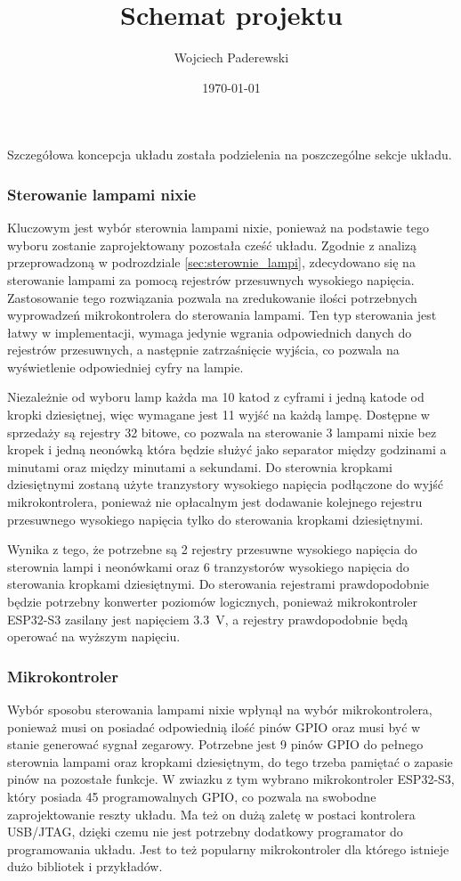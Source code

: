 \documentclass[../main.tex]{subfiles}
\author{Wojciech Paderewski}
\date{\today}
\title{Schemat projektu}
\begin{document}
Szczegółowa koncepcja układu została podzielenia na poszczególne sekcje układu.

\subsubsection{Sterowanie lampami nixie}
Kluczowym jest wybór sterownia lampami nixie, ponieważ na podstawie tego wyboru zostanie zaprojektowany pozostała cześć układu.
Zgodnie z analizą przeprowadzoną w podrozdziale \ref{sec:sterownie_lampi}, zdecydowano się na sterowanie lampami za pomocą rejestrów przesuwnych wysokiego napięcia.
Zastosowanie tego rozwiązania pozwala na zredukowanie ilości potrzebnych wyprowadzeń mikrokontrolera do sterowania lampami. Ten typ sterowania jest łatwy w implementacji,
wymaga jedynie wgrania odpowiednich danych do rejestrów przesuwnych, a następnie zatrzaśnięcie
 wyjścia, co pozwala na wyświetlenie odpowiedniej cyfry na lampie.

Niezależnie od wyboru lamp każda ma 10 katod z cyframi i jedną katode od kropki dziesiętnej, więc wymagane jest 11 wyjść na każdą lampę.
Dostępne w sprzedaży są rejestry 32 bitowe, co pozwala na sterowanie 3 lampami nixie bez kropek i jedną neonówką która będzie
służyć jako separator między godzinami a minutami oraz między minutami a sekundami. Do sterownia kropkami dziesiętnymi zostaną użyte tranzystory wysokiego napięcia podłączone do wyjść mikrokontrolera,
ponieważ nie opłacalnym jest dodawanie kolejnego rejestru przesuwnego wysokiego napięcia tylko do sterowania kropkami dziesiętnymi.

Wynika z tego, że potrzebne są 2 rejestry przesuwne wysokiego napięcia do sterownia lampi i neonówkami oraz 6 tranzystorów wysokiego napięcia do sterowania kropkami dziesiętnymi.
Do sterowania rejestrami prawdopodobnie będzie potrzebny konwerter poziomów logicznych, ponieważ mikrokontroler ESP32-S3 zasilany jest napięciem \SI{3.3}{\volt}, a rejestry prawdopodobnie będą operować na wyższym napięciu.
\subsubsection{Mikrokontroler}
Wybór sposobu sterowania lampami nixie wpłynął na wybór mikrokontrolera, ponieważ musi on posiadać odpowiednią ilość pinów GPIO oraz musi być w stanie generować sygnał zegarowy.
Potrzebne jest 9 pinów GPIO do pełnego sterownia lampami oraz kropkami dziesiętnym, do tego trzeba pamiętać o zapasie pinów na pozostałe funkcje. W zwiazku z tym
wybrano mikrokontroler ESP32-S3, który posiada 45 programowalnych GPIO, co pozwala na swobodne zaprojektowanie reszty układu. Ma też on dużą zaletę w postaci kontrolera USB/JTAG,
dzięki czemu nie jest potrzebny dodatkowy programator do programowania układu. Jest to też popularny mikrokontroler dla którego istnieje dużo bibliotek i przykładów.
\end{document}
